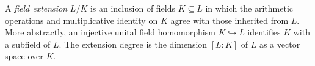 
A \emph{field extension} $L/K$ is an inclusion of fields $K\subseteq L$ in which the arithmetic operations and multiplicative identity on $K$ agree with those inherited from $L$. More abstractly, an injective unital field homomorphism $K\hookrightarrow L$ identifies $K$ with a subfield of $L$. The extension degree is the dimension $[L:K]$ of $L$ as a vector space over $K$.
